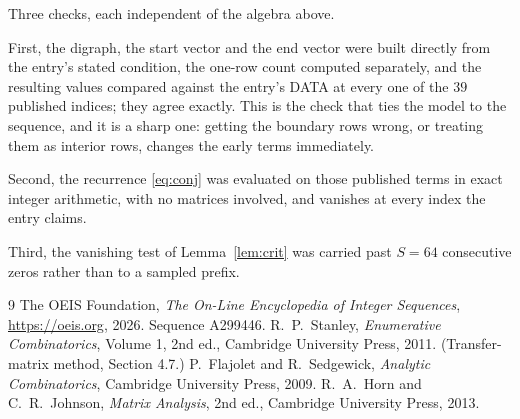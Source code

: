 \documentclass[11pt,a4paper]{article}
\theoremstyle{plain}
\theoremstyle{definition}
\begin{document}
Three checks, each independent of the algebra above.

First, the digraph, the start vector and the end vector were built directly from the
entry's stated condition, the one-row count computed separately, and the resulting values
compared against the entry's DATA at every one of the $39$ published indices; they
agree exactly. This is the check that ties the model to the sequence, and it is a sharp one:
getting the boundary rows wrong, or treating them as interior rows, changes the early terms
immediately.

Second, the recurrence \eqref{eq:conj} was evaluated on those published terms in exact
integer arithmetic, with no matrices involved, and vanishes at every index the entry claims.

Third, the vanishing test of Lemma~\ref{lem:crit} was carried past $S=64$ consecutive
zeros rather than to a sampled prefix.

\begin{thebibliography}{9}
 The OEIS Foundation, \emph{The On-Line Encyclopedia of Integer
Sequences}, \url{https://oeis.org}, 2026. Sequence A299446.
 R.~P.~Stanley, \emph{Enumerative Combinatorics}, Volume 1, 2nd ed.,
Cambridge University Press, 2011. (Transfer-matrix method, Section 4.7.)
 P.~Flajolet and R.~Sedgewick, \emph{Analytic Combinatorics}, Cambridge
University Press, 2009.
 R.~A.~Horn and C.~R.~Johnson, \emph{Matrix Analysis}, 2nd ed., Cambridge
University Press, 2013.
\end{thebibliography}
\end{document}
